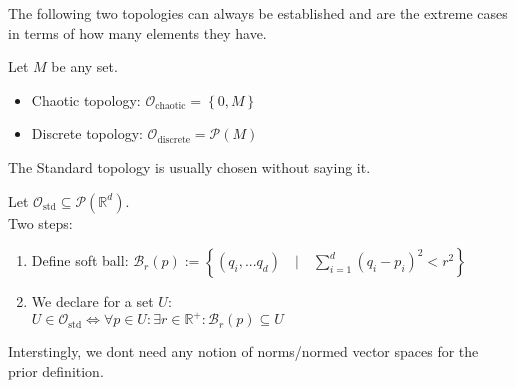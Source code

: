 The following two topologies can always be established and are the extreme cases in terms of how many elements they have.
\begin{example}
    Let $M$ be any set.
    \begin{itemize}[noitemsep, topsep=0pt]
        \item Chaotic topology: $\mathcal{O}_{\text{chaotic}} = \left \{ 0,M \right \}$
        \item Discrete topology: $\mathcal{O}_{\text{discrete}} = \mathcal{P}(M)$
    \end{itemize}
\end{example}

The Standard topology is usually chosen without saying it.
\begin{framed}
\begin{definition}
    Let $\mathcal{O}_{\text{std}} \subseteq \mathcal{P}(\mathbb{R}^d)$.\\
    Two steps:
    \begin{enumerate}[noitemsep, topsep=0pt]
        \item Define soft ball: $\mathcal{B}_r(p) := \left \{ (q_i,... q_d) \quad|\quad \sum_{i=1}^d (q_i-p_i)^2 < r^2 \right \}$
        \item We declare for a set $U$: \\ $U\in \mathcal{O}_{\text{std}} \iff \forall p\in U: \exists r\in \mathbb{R}^+: \mathcal{B}_r(p) \subseteq U$
    \end{enumerate}    
\end{definition}
\end{framed}

Interstingly, we dont need any notion of norms/normed vector spaces for the prior definition.

